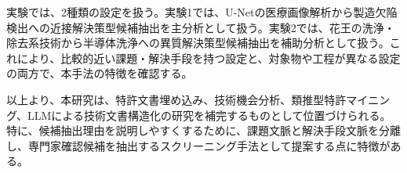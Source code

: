実験では、2種類の設定を扱う。実験1では、U-Netの医療画像解析から製造欠陥検出への近接解決策型候補抽出を主分析として扱う。実験2では、花王の洗浄・除去系技術から半導体洗浄への異質解決策型候補抽出を補助分析として扱う。これにより、比較的近い課題・解決手段を持つ設定と、対象物や工程が異なる設定の両方で、本手法の特徴を確認する。

以上より、本研究は、特許文書埋め込み、技術機会分析、類推型特許マイニング、LLMによる技術文書構造化の研究を補完するものとして位置づけられる。特に、候補抽出理由を説明しやすくするために、課題文脈と解決手段文脈を分離し、専門家確認候補を抽出するスクリーニング手法として提案する点に特徴がある。
